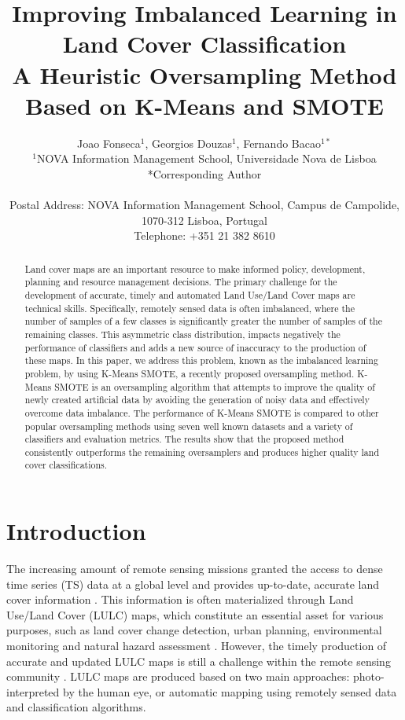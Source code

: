\documentclass[parskip=full]{scrartcl}
\title{Improving Imbalanced Learning in Land Cover Classification \\ 
	\LARGE{A Heuristic Oversampling Method Based on K-Means and SMOTE}}
\author{
	Joao Fonseca\(^{1}\), Georgios Douzas\(^{1}\), Fernando Bacao\(^{1*}\) 
	\\
	\small{\(^{1}\)NOVA Information Management School, Universidade Nova de Lisboa}
	\\
	\small{*Corresponding Author}
	\\
	\\
	\small{Postal Address: NOVA Information Management School, Campus de Campolide, 1070-312 Lisboa, Portugal}
	\\
	\small{Telephone: +351 21 382 8610}
}
\date{}
\begin{document}
\maketitle

\begin{abstract}

    Land cover maps are an important resource to make informed policy,
    development, planning and resource management decisions. The primary
    challenge for the development of accurate, timely and automated Land
    Use/Land Cover maps are technical skills. Specifically, remotely sensed data
    is often imbalanced, where the number of samples of a few classes is
    significantly greater the number of samples of the remaining classes. This
    asymmetric class distribution, impacts negatively the performance of
    classifiers and adds a new source of inaccuracy to the production of these
    maps. In this paper, we address this problem, known as the imbalanced
    learning problem, by using K-Means SMOTE, a recently proposed oversampling
    method. K-Means SMOTE is an oversampling algorithm that attempts to improve
    the quality of newly created artificial data by avoiding the generation of
    noisy data and effectively overcome data imbalance. The performance of
    K-Means SMOTE is compared to other popular oversampling methods using seven
    well known datasets and a variety of classifiers and evaluation metrics. The
    results show that the proposed method consistently outperforms the remaining
    oversamplers and produces higher quality land cover classifications.

\end{abstract}

\section{Introduction}


The increasing amount of remote sensing missions granted the access to dense
time series (TS) data at a global level and provides up-to-date, accurate land
cover information \cite{Drusch2012}. This information is often materialized
through Land Use/Land Cover (LULC) maps, which constitute an essential asset for
various purposes, such as land cover change detection, urban planning,
environmental monitoring and natural hazard assessment \cite{Khatami2016}.
However, the timely production of accurate and updated LULC maps is still a
challenge within the remote sensing community \cite{Wulder2018}. LULC maps are
produced based on two main approaches: photo-interpreted by the human eye, or
automatic mapping using remotely sensed data and classification algorithms.
\end{document}
